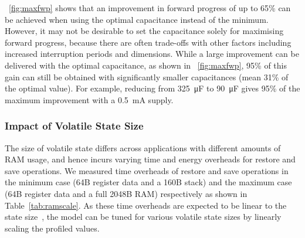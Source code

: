 \figurename{~\ref{fig:maxfwp}} shows that an improvement in forward progress of up to 65\%  can be achieved when using the optimal capacitance instead of the minimum. However, it may not be desirable to set the capacitance solely for maximising forward progress, because there are often trade-offs with other factors including increased interruption periods and dimensions. 
While a large improvement can be delivered with the optimal capacitance, as shown in \figurename{~\ref{fig:maxfwp}}, 95\% of this gain can still be obtained with significantly smaller capacitances (mean 31\% of the optimal value).
For example, reducing from \SI{325}{\micro\farad} to \SI{90}{\micro\farad} gives 95\% of the maximum improvement with a \SI{0.5}{\milli\ampere} supply. 


\subsubsection{Impact of Volatile State Size}

The size of volatile state differs across applications with different amounts of RAM usage, and hence incurs varying time and energy overheads for restore and save operations. We measured time overheads of restore and save operations in the minimum case (64B register data and a 160B stack) and the maximum case (64B register data and a full 2048B RAM) respectively as shown in Table~\ref{tab:ramscale}. As these time overheads are expected to be linear to the state size~\cite{sliper2019efficient}, the model can be tuned for various volatile state sizes by linearly scaling the profiled values. 

